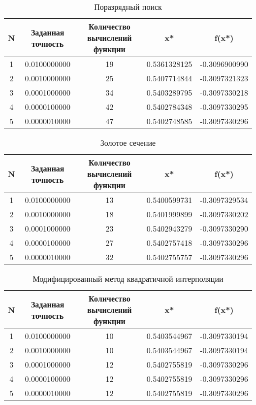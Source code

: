 
\begin{table}[h]
\caption{Поразрядный поиск}
\centering
\begin{tabular}{| c | c | c | c | c |} \hline 
 N & Заданная точность & Количество вычислений функции & x* & f(x*) \\ 
 \hline 
  1 &    0.0100000000 &    19 &    0.5361328125 &   -0.3096900990 \\\hline 
  2 &    0.0010000000 &    25 &    0.5407714844 &   -0.3097321323 \\\hline 
  3 &    0.0001000000 &    34 &    0.5403289795 &   -0.3097330218 \\\hline 
  4 &    0.0000100000 &    42 &    0.5402784348 &   -0.3097330295 \\\hline 
  5 &    0.0000010000 &    47 &    0.5402748585 &   -0.3097330296 \\\hline 
\end{tabular}
\end{table}

\begin{table}[h]
\caption{Золотое сечение}
\centering
\begin{tabular}{| c | c | c | c | c |} \hline 
 N & Заданная точность & Количество вычислений функции & x* & f(x*) \\ 
 \hline 
  1 &    0.0100000000 &    13 &    0.5400599731 &   -0.3097329534 \\\hline 
  2 &    0.0010000000 &    18 &    0.5401999899 &   -0.3097330202 \\\hline 
  3 &    0.0001000000 &    23 &    0.5402943279 &   -0.3097330290 \\\hline 
  4 &    0.0000100000 &    27 &    0.5402757418 &   -0.3097330296 \\\hline 
  5 &    0.0000010000 &    32 &    0.5402755757 &   -0.3097330296 \\\hline 
\end{tabular}
\end{table}

\begin{table}[h]
\caption{Модифицированный метод квадратичной интерполяции}
\centering
\begin{tabular}{| c | c | c | c | c |} \hline 
 N & Заданная точность & Количество вычислений функции & x* & f(x*) \\ 
 \hline 
  1 &    0.0100000000 &    10 &    0.5403544967 &   -0.3097330194 \\\hline 
  2 &    0.0010000000 &    10 &    0.5403544967 &   -0.3097330194 \\\hline 
  3 &    0.0001000000 &    12 &    0.5402755819 &   -0.3097330296 \\\hline 
  4 &    0.0000100000 &    12 &    0.5402755819 &   -0.3097330296 \\\hline 
  5 &    0.0000010000 &    12 &    0.5402755819 &   -0.3097330296 \\\hline 
\end{tabular}
\end{table}


